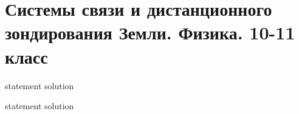 \chapter{Системы связи и дистанционного зондирования Земли. Физика. 10-11 класс}

{statement}
{solution}

{statement}
{solution}